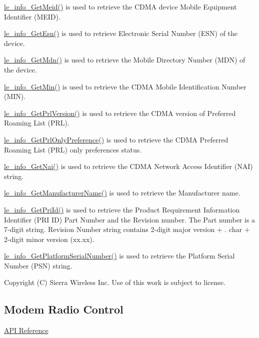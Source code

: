 \hyperlink{le__info__interface_8h_a7e72f4ea46e0354a359f5dd08bf3eee2}{le\+\_\+info\+\_\+\+Get\+Meid()} is used to retrieve the C\+D\+M\+A device Mobile Equipment Identifier (M\+E\+I\+D).

\hyperlink{le__info__interface_8h_a60e5327bbc91669c8bb92cd8df19fc69}{le\+\_\+info\+\_\+\+Get\+Esn()} is used to retrieve Electronic Serial Number (E\+S\+N) of the device.

\hyperlink{le__info__interface_8h_a03837e7763a2de9fef400bc6ff099ed9}{le\+\_\+info\+\_\+\+Get\+Mdn()} is used to retrieve the Mobile Directory Number (M\+D\+N) of the device.

\hyperlink{le__info__interface_8h_a6269c360fcee8fc52d0fe462ba65eda9}{le\+\_\+info\+\_\+\+Get\+Min()} is used to retrieve the C\+D\+M\+A Mobile Identification Number (M\+I\+N).

\hyperlink{le__info__interface_8h_ab12105ea6f654c3124ec812234e0f1fa}{le\+\_\+info\+\_\+\+Get\+Prl\+Version()} is used to retrieve the C\+D\+M\+A version of Preferred Roaming List (P\+R\+L).

\hyperlink{le__info__interface_8h_a3f2f3ea1720f9ff173483046966ebdb3}{le\+\_\+info\+\_\+\+Get\+Prl\+Only\+Preference()} is used to retrieve the C\+D\+M\+A Preferred Roaming List (P\+R\+L) only preferences status.

\hyperlink{le__info__interface_8h_ae87f9481c09d0357ff31379b8bd8f233}{le\+\_\+info\+\_\+\+Get\+Nai()} is used to retrieve the C\+D\+M\+A Network Access Identifier (N\+A\+I) string.

\hyperlink{le__info__interface_8h_a8b44d64cf12cd4d5475482f6ec8b70f5}{le\+\_\+info\+\_\+\+Get\+Manufacturer\+Name()} is used to retrieve the Manufacturer name.

\hyperlink{le__info__interface_8h_a18940ac413b3df2bac02892d243d6bd4}{le\+\_\+info\+\_\+\+Get\+Pri\+Id()} is used to retrieve the Product Requirement Information Identifier (P\+R\+I I\+D) Part Number and the Revision number. The Part number is a 7-\/digit string. Revision Number string contains 2-\/digit major version + \textquotesingle{}.\textquotesingle{} char + 2-\/digit minor version (xx.\+xx).

\hyperlink{le__info__interface_8h_a23d1f0f22d275ae334c4124e56f1d7e5}{le\+\_\+info\+\_\+\+Get\+Platform\+Serial\+Number()} is used to retrieve the Platform Serial Number (P\+S\+N) string.





Copyright (C) Sierra Wireless Inc. Use of this work is subject to license. \hypertarget{c_mrc}{}\subsection{Modem Radio Control}\label{c_mrc}
\hyperlink{le__mrc__interface_8h}{A\+P\+I Reference}






